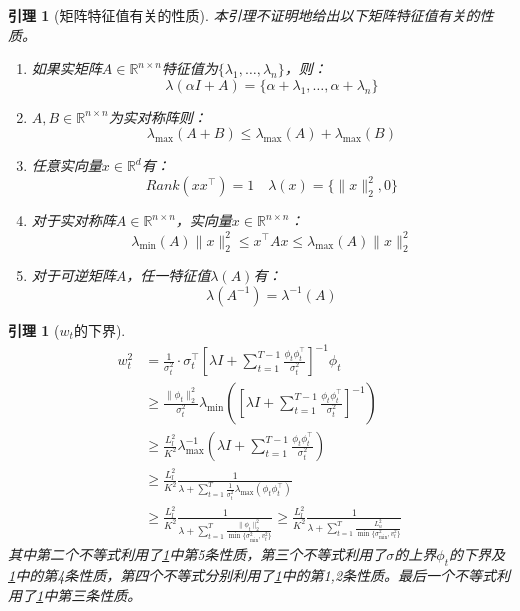 \documentclass[UTF8,a4paper,10.5pt]{ctexart}
\newcommand{\R}{\mathbb{R}}
\newtheorem{lemma}[theorem]{引理}
\begin{document}
\begin{lemma}[矩阵特征值有关的性质]
	本引理不证明地给出以下矩阵特征值有关的性质。
	\begin{enumerate}
		\item 如果实矩阵$A\in \R^{n\times n}$特征值为$\{\lambda_1,\ldots, \lambda_n\}$，则：
		\begin{equation*}
			\lambda(\alpha I + A) = \{\alpha + \lambda_1, \ldots, \alpha + \lambda_n\}
		\end{equation*}
		\item $A,B \in \R^{n\times n}$为实对称阵则：
		\begin{equation*}
			\lambda_{\max}(A+B) \leq \lambda_{\max}(A) + \lambda_{\max}(B)
		\end{equation*}
		\item 任意实向量$x\in \R^{d}$有：
		\begin{equation*}
			Rank(xx^\top) = 1 \quad \lambda(x) = \{\|x\|_2^2,0\}
		\end{equation*}
		\item 对于实对称阵$A \in \R^{n\times n}$，实向量$x\in \R^{n\times n}$：
		\begin{equation*}
			\lambda_{\min}(A)\|x\|_2^2 \leq x^\top A x\leq \lambda_{\max}(A)\|x\|_2^2
		\end{equation*}
		\item 对于可逆矩阵$A$，任一特征值$\lambda(A)$有：
		\begin{equation*}
			\lambda(A^{-1}) = \lambda^{-1}(A)
		\end{equation*}
	\end{enumerate}
	\label{matrix}
\end{lemma}
\begin{lemma}[$w_t$的下界]
	\begin{align*}
		w_t^2 &= \frac{1}{\sigma_t^2}\cdot \sigma_t^\top \left[\lambda I + \sum_{t=1}^{T-1}\frac{\phi_t\phi_t^\top}{\sigma_t^2}\right]^{-1}\phi_t \\
		& \geq \frac{\|\phi_t\|_2^2}{\sigma_t^2}\lambda_{\min}\left(\left[\lambda I + \sum_{t=1}^{T-1}\frac{\phi_t\phi_t^\top}{\sigma_t^2}\right]^{-1} \right) \\
		& \geq \frac{L_l^2}{K^2}\lambda_{\max}^{-1}\left(\lambda I + \sum_{t=1}^{T-1}\frac{\phi_t\phi_t^\top}{\sigma_t^2}\right) \\
		& \geq \frac{L_l^2}{K^2} \frac{1}{\lambda + \sum_{t=1}^T\frac{1}{\sigma_t^2}\lambda_{\max}(\phi_t\phi_t^\top)} \\
		& \geq \frac{L_l^2}{K^2} \frac{1}{\lambda + \sum_{t=1}^T \frac{\|\phi_t\|_2^2}{\min\{\sigma_{\min}^2,v_t^2\}}} \geq \frac{L_l^2}{K^2} \frac{1}{\lambda + \sum_{t=1}^T \frac{L_u^2}{\min\{\sigma_{\min}^2,v_t^2\}}}
	\end{align*}
	其中第二个不等式利用了\ref{matrix}中第5条性质，第三个不等式利用了$\sigma$的上界$\phi_t$的下界及\ref{matrix}中的第4条性质，第四个不等式分别利用了\ref{matrix}中的第1,2条性质。最后一个不等式利用了\ref{matrix}中第三条性质。
	\label{wt_lower}
\end{lemma}
\end{document}
